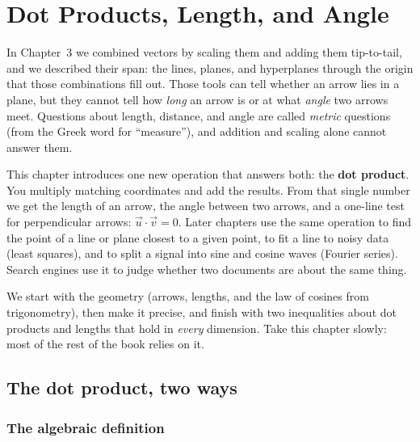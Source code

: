 \chapter{Dot Products, Length, and Angle}

In Chapter~3 we combined vectors by scaling them and adding them tip-to-tail, and
we described their span: the lines, planes, and hyperplanes through the origin that
those combinations fill out. Those tools can tell whether an arrow lies in a plane,
but they cannot tell how \emph{long} an arrow is or at what \emph{angle} two arrows
meet. Questions about length, distance, and angle are called \emph{metric}
questions (from the Greek word for ``measure''), and addition and scaling alone
cannot answer them.

This chapter introduces one new operation that answers both: the
\textbf{dot product}. You multiply matching coordinates and add the results. From
that single number we get the length of an arrow, the angle between two arrows,
and a one-line test for perpendicular arrows: $\vec u \cdot \vec v = 0$. Later
chapters use the same operation to find the point of a line or plane closest to a
given point, to fit a line to noisy data (least squares), and to split a signal
into sine and cosine waves (Fourier series). Search engines use it to judge whether
two documents are about the same thing.

We start with the geometry (arrows, lengths, and the law of cosines from
trigonometry), then make it precise, and finish with two inequalities about dot
products and lengths that hold in \emph{every} dimension. Take this chapter slowly:
most of the rest of the book relies on it.

\chapterline

\section{The dot product, two ways}
\label{ch04:dot-def}

\subsection{The algebraic definition}

